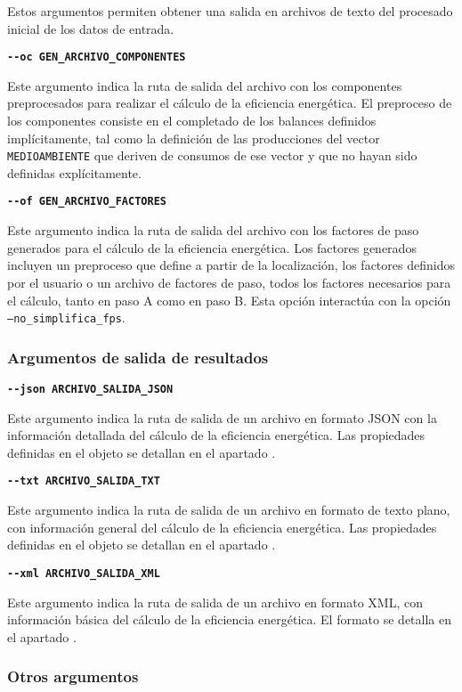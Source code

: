 \documentclass[10pt,notitlepage,oneside,a4paper]{article}
\begin{document}
Estos argumentos permiten obtener una salida en archivos de texto del procesado inicial de los datos de entrada.

\textbf{\texttt{-{}-oc GEN\_ARCHIVO\_COMPONENTES}}

Este argumento indica la ruta de salida del archivo con los componentes preprocesados para realizar el cálculo de la eficiencia energética. El preproceso de los componentes consiste en el completado de los balances definidos implícitamente, tal como la definición de las producciones del vector \texttt{MEDIOAMBIENTE} que deriven de consumos de ese vector y que no hayan sido definidas explícitamente.

\textbf{\texttt{-{}-of GEN\_ARCHIVO\_FACTORES}}

Este argumento indica la ruta de salida del archivo con los factores de paso generados para el cálculo de la eficiencia energética. Los factores generados incluyen un preproceso que define a partir de la localización, los factores definidos por el usuario o un archivo de factores de paso, todos los factores necesarios para el cálculo, tanto en paso A como en paso B. Esta opción interactúa con la opción \texttt{--no\_simplifica\_fps}.

\subsubsection{Argumentos de salida de resultados}

\textbf{\texttt{-{}-json ARCHIVO\_SALIDA\_JSON}}

Este argumento indica la ruta de salida de un archivo en formato JSON con la información detallada del cálculo de la eficiencia energética. Las propiedades definidas en el objeto se detallan en el apartado .

\textbf{\texttt{-{}-txt ARCHIVO\_SALIDA\_TXT}}

Este argumento indica la ruta de salida de un archivo en formato de texto plano, con información general del cálculo de la eficiencia energética. Las propiedades definidas en el objeto se detallan en el apartado .

\textbf{\texttt{-{}-xml ARCHIVO\_SALIDA\_XML}}

Este argumento indica la ruta de salida de un archivo en formato XML, con información básica del cálculo de la eficiencia energética. El formato se detalla en el apartado .

\subsubsection{Otros argumentos}
\end{document}
